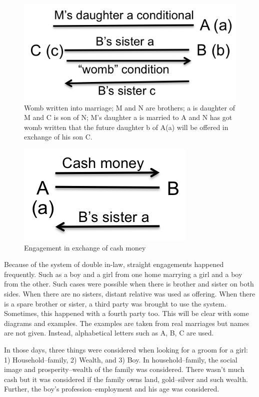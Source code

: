 \begin{figure}
\center
\includegraphics{figures/engagement/womb_7}
\caption{Womb written into marriage; M and N are brothers; a is daughter of M and C is son of N; M's daughter a is married to A and N has got womb written that the future daughter b of A(a) will be offered in exchange of his son C.
\label{figure:engage_7}}
\end{figure}

\begin{figure}
\center
\includegraphics{figures/engagement/cash_8}
\caption{Engagement in exchange of cash money
\label{figure:engage_8}}
\end{figure}

Because of the system of double in-law, straight engagements happened
frequently. Such as a boy and a girl from one home marrying a girl and a boy
from the other. Such cases were possible when there is brother and sister on
both sides. When there are no sisters, distant relative was used as offering.
When there is a spare brother or sister, a third party was brought to use the
system. Sometimes, this happened with a fourth party too. This will be clear
with some diagrams and examples. The examples are taken from real marriages but
names are not given. Instead, alphabetical letters such as A, B, C are used.

In those days, three things were considered when looking for a groom for a
girl: 1) Household--family, 2) Wealth, and 3) Boy. In household--family, the
social image and prosperity--wealth of the family was considered. There wasn't
much cash but it was considered if the family owns land, gold--silver and such
wealth. Further, the boy's profession--employment and his age was considered.

